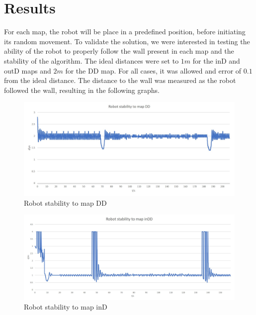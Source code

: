 \documentclass[10pt,journal,compsoc]{IEEEtran}
\begin{document}
\section{Results}
For each map, the robot will be place in a predefined position, before initiating its random movement. To validate the solution, we were interested in testing the ability of the robot to properly follow the wall present in each map and the stability of the algorithm. 
The ideal distances were set to $1m$ for the inD and outD maps and $2m$ for the DD map. For all cases, it was allowed and error of $0.1$ from the ideal distance. The distance to the wall was measured as the robot followed the wall, resulting in the following graphs.
 
   \begin{figure}[thpb]
      \centering
     \includegraphics[scale=0.2]{img/map_DD.jpg}
      \caption{Robot stability to map DD}
      \label{fig:result_DD_map}
   \end{figure}
   
      \begin{figure}[thpb]
      \centering
     \includegraphics[scale=0.19]{img/map_inD.jpg}
      \caption{Robot stability to map inD}
      \label{fig:result_inD_map}
   \end{figure}
   
\end{document}
